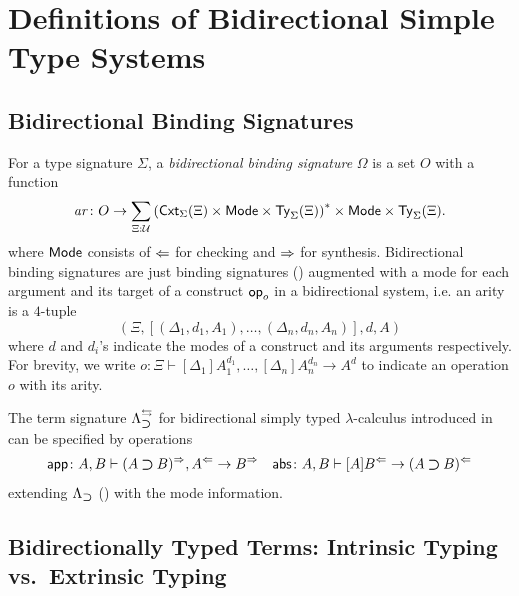\documentclass[acmsmall]{acmart}
\theoremstyle{acmdefinition}
\begin{document}
\section{Definitions of Bidirectional Simple Type Systems} 

\subsection{Bidirectional Binding Signatures}

\begin{definition}
  For a type signature $\Sigma$, a \emph{bidirectional binding signature} $\Omega$ is a set $O$ with a function
  \[
    \mathit{ar}\colon O \to \sum_{\Xi : \mathcal{U}} \left(\mathsf{Cxt}_{\Sigma}(\Xi) \times \mathsf{Mode} \times \mathsf{Ty}_{\Sigma}(\Xi)\right)^* \times \mathsf{Mode} \times \mathsf{Ty}_{\Sigma}(\Xi).
  \]
  where $\mathsf{Mode}$ consists of $\Leftarrow$ for checking and $\Rightarrow$ for synthesis.
  Bidirectional binding signatures are just binding signatures () augmented with a mode for each argument and its target of a construct $\mathsf{op}_o$ in a bidirectional system, i.e.
  an arity is a $4$-tuple
  \[
    \left(\Xi, \left[\left(\Delta_1, d_1, A_1\right), \ldots, \left(\Delta_{n}, d_n, A_{n}\right) \right], d, A\right)
  \]
  where $d$ and $d_i$'s indicate the modes of a construct and its arguments respectively.
  For brevity, we write $o \colon \Xi \vdash [\Delta_1]A_{1}^{d_1}, \ldots, [\Delta_{n}] A^{d_n}_{n} \to A^{d}$ to indicate an operation $o$ with its arity. 
\end{definition}

\begin{example}
  The term signature $\Lambda_{\mathbin{\bm{\supset}}}^{\leftrightarrows}$ for bidirectional simply typed $\lambda$-calculus introduced in  can be specified by operations 
  \begin{align*}
    \mathsf{app}\colon A, B \vdash (A \mathbin{\bm{\supset}} B)^{\Rightarrow}, A^{\Leftarrow} \to B^{\Rightarrow} &&
    \mathsf{abs}\colon A , B \vdash [A]B^{\Leftarrow} \to (A \mathbin{\bm{\supset}} B)^{\Leftarrow}
  \end{align*}
  extending $\Lambda_{\mathbin{\bm{\supset}}}$ () with the mode information.
\end{example}

\subsection{Bidirectionally Typed Terms: Intrinsic Typing vs.\ Extrinsic Typing}
\end{document}
